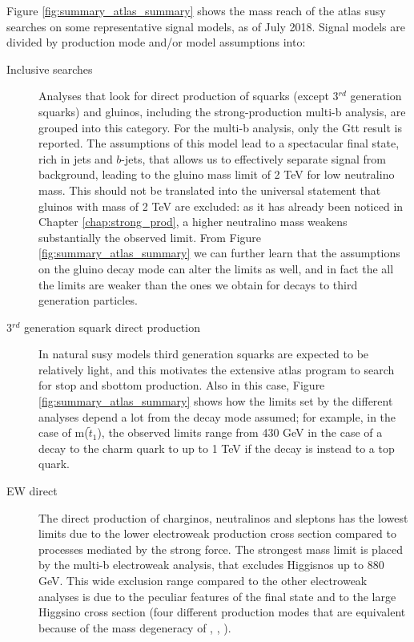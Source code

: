 Figure \ref{fig:summary_atlas_summary} shows the mass reach of the \gls{atlas} \gls{susy} searches on 
some representative signal models, as of July 2018. 
Signal models are divided by production mode and/or model assumptions into:
\begin{description}

\item[Inclusive searches] Analyses that look for direct production of squarks (except 3$^{rd}$ generation squarks)
and gluinos, including the strong-production multi-b analysis, are grouped into this category. For the multi-b analysis,
only the Gtt result is reported. The assumptions of this model lead to a spectacular final state, rich in jets and $b$-jets, that 
allows us to effectively separate signal from background, leading to the gluino mass limit of 2 TeV for low neutralino mass.
This should not be translated into the universal statement that gluinos with mass of 2 TeV are excluded: 
as it has already been noticed in Chapter \ref{chap:strong_prod}, a higher neutralino mass weakens substantially the observed limit.
From Figure \ref{fig:summary_atlas_summary} we can further learn that the assumptions on the gluino decay mode can alter the limits as well,
and in fact the all the limits are weaker than the ones we obtain for decays to third generation particles.

\item[3$^{rd}$ generation squark direct production] In natural \gls{susy} models third generation squarks are expected to be 
relatively light, and this motivates the extensive \gls{atlas} program to search for stop and sbottom production. 
Also in this case, Figure \ref{fig:summary_atlas_summary} shows how the limits set by the different analyses depend a lot from the 
decay mode assumed; for example, in the case of m($\tilde{t}_1$), the observed limits range from 430 GeV in the case of a decay 
to the charm quark to up to 1 TeV if the decay is instead to a top quark.

\item[EW direct] The direct production of charginos, neutralinos and sleptons has the lowest limits due to the lower electroweak
production cross section compared to processes mediated by the strong force. The strongest mass limit is placed by the multi-b 
electroweak analysis, that excludes Higgisnos up to 880 GeV. This wide exclusion range compared to the other electroweak analyses
is due to the peculiar features of the final state and to the large Higgsino cross section (four different production modes that are equivalent 
because of the mass degeneracy of \ninoone, \ninotwo, \chinoonepm). 


\end{description}
